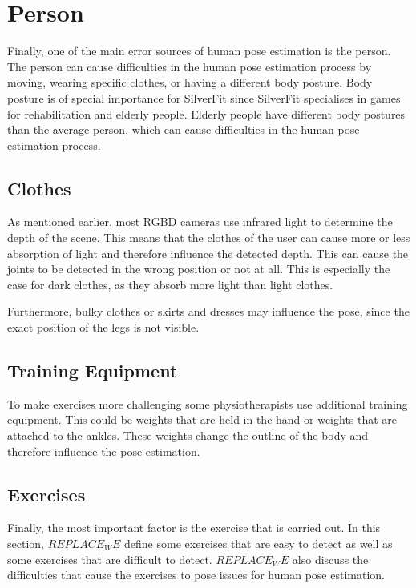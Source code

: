 \section{Person}

Finally, one of the main error sources of human pose estimation is the person. The person can cause difficulties in the human pose estimation process by moving, wearing specific clothes, or having a different body posture. Body posture is of special importance for SilverFit since SilverFit specialises in games for rehabilitation and elderly people. Elderly people have different body postures than the average person, which can cause difficulties in the human pose estimation process.

\subsection{Clothes}

As mentioned earlier, most RGBD cameras use infrared light to determine the depth of the scene. This means that the clothes of the user can cause more or less absorption of light and therefore influence the detected depth. This can cause the joints to be detected in the wrong position or not at all. This is especially the case for dark clothes, as they absorb more light than light clothes.

Furthermore, bulky clothes or skirts and dresses may influence the pose, since the exact position of the legs is not visible.

\subsection{Training Equipment}

To make exercises more challenging some physiotherapists use additional training equipment. This could be weights that are held in the hand or weights that are attached to the ankles. These weights change the outline of the body and therefore influence the pose estimation. 

\subsection{Exercises}
\label{sec:exercises}

Finally, the most important factor is the exercise that is carried out. In this section, $REPLACE_WE$ define some exercises that are easy to detect as well as some exercises that are difficult to detect. $REPLACE_WE$ also discuss the difficulties that cause the exercises to pose issues for human pose estimation.

